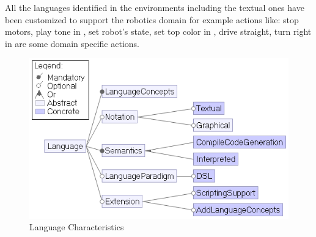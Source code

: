 All the languages identified in the environments including the textual ones have been customized to support the robotics domain for example actions like: stop motors, play tone in \trik, set robot's state, set top color in \aseba,  drive straight, turn right in \lego are some domain specific actions.%

\begin{figure}[t]
     \centering
    \includegraphics[width=\columnwidth]{Languagefeatures.png}
      \caption{Language Characteristics}
      \label{fig:languagefeatures}
   \end{figure}

